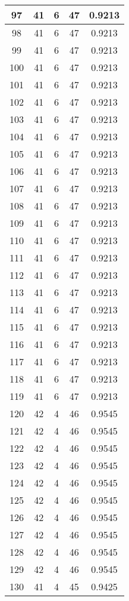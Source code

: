 \documentclass[letterpaper, 12pt]{article}
\begin{document}
\begin{longtable}{|c|c|c|c|c|}
\hline
97 & 41 & 6 & 47 & 0.9213 \\
\hline
98 & 41 & 6 & 47 & 0.9213 \\
\hline
99 & 41 & 6 & 47 & 0.9213 \\
\hline
100 & 41 & 6 & 47 & 0.9213 \\
\hline
101 & 41 & 6 & 47 & 0.9213 \\
\hline
102 & 41 & 6 & 47 & 0.9213 \\
\hline
103 & 41 & 6 & 47 & 0.9213 \\
\hline
104 & 41 & 6 & 47 & 0.9213 \\
\hline
105 & 41 & 6 & 47 & 0.9213 \\
\hline
106 & 41 & 6 & 47 & 0.9213 \\
\hline
107 & 41 & 6 & 47 & 0.9213 \\
\hline
108 & 41 & 6 & 47 & 0.9213 \\
\hline
109 & 41 & 6 & 47 & 0.9213 \\
\hline
110 & 41 & 6 & 47 & 0.9213 \\
\hline
111 & 41 & 6 & 47 & 0.9213 \\
\hline
112 & 41 & 6 & 47 & 0.9213 \\
\hline
113 & 41 & 6 & 47 & 0.9213 \\
\hline
114 & 41 & 6 & 47 & 0.9213 \\
\hline
115 & 41 & 6 & 47 & 0.9213 \\
\hline
116 & 41 & 6 & 47 & 0.9213 \\
\hline
117 & 41 & 6 & 47 & 0.9213 \\
\hline
118 & 41 & 6 & 47 & 0.9213 \\
\hline
119 & 41 & 6 & 47 & 0.9213 \\
\hline
120 & 42 & 4 & 46 & 0.9545 \\
\hline
121 & 42 & 4 & 46 & 0.9545 \\
\hline
122 & 42 & 4 & 46 & 0.9545 \\
\hline
123 & 42 & 4 & 46 & 0.9545 \\
\hline
124 & 42 & 4 & 46 & 0.9545 \\
\hline
125 & 42 & 4 & 46 & 0.9545 \\
\hline
126 & 42 & 4 & 46 & 0.9545 \\
\hline
127 & 42 & 4 & 46 & 0.9545 \\
\hline
128 & 42 & 4 & 46 & 0.9545 \\
\hline
129 & 42 & 4 & 46 & 0.9545 \\
\hline
130 & 41 & 4 & 45 & 0.9425 \\

\end{longtable}
\end{document}
